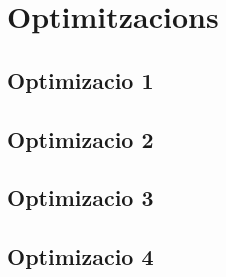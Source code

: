 \chapter{Optimitzacions}

\section{Optimizacio 1}
\section{Optimizacio 2}
\section{Optimizacio 3}
\section{Optimizacio 4}
